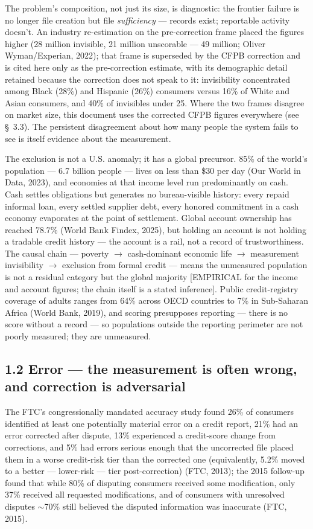 \documentclass[11pt,twocolumn]{article}
\begin{document}
The problem's composition, not just its size, is diagnostic: the frontier failure is no longer file creation but file \emph{sufficiency} --- records exist; reportable activity doesn't. An industry re-estimation on the pre-correction frame placed the figures higher (28 million invisible, 21 million unscorable --- 49 million; Oliver Wyman/Experian, 2022); that frame is superseded by the CFPB correction and is cited here only as the pre-correction estimate, with its demographic detail retained because the correction does not speak to it: invisibility concentrated among Black (28\%) and Hispanic (26\%) consumers versus 16\% of White and Asian consumers, and 40\% of invisibles under 25. Where the two frames disagree on market size, this document uses the corrected CFPB figures everywhere (see \S~3.3). The persistent disagreement about how many people the system fails to see is itself evidence about the measurement.

The exclusion is not a U.S. anomaly; it has a global precursor. 85\% of the world's population --- 6.7 billion people --- lives on less than \$30 per day (Our World in Data, 2023), and economies at that income level run predominantly on cash. Cash settles obligations but generates no bureau-visible history: every repaid informal loan, every settled supplier debt, every honored commitment in a cash economy evaporates at the point of settlement. Global account ownership has reached 78.7\% (World Bank Findex, 2025), but holding an account is not holding a tradable credit history --- the account is a rail, not a record of trustworthiness. The causal chain --- poverty $\rightarrow$ cash-dominant economic life $\rightarrow$ measurement invisibility $\rightarrow$ exclusion from formal credit --- means the unmeasured population is not a residual category but the global majority [EMPIRICAL for the income and account figures; the chain itself is a stated inference]. Public credit-registry coverage of adults ranges from 64\% across OECD countries to 7\% in Sub-Saharan Africa (World Bank, 2019), and scoring presupposes reporting --- there is no score without a record --- so populations outside the reporting perimeter are not poorly measured; they are unmeasured.

\subsection*{1.2 Error --- the measurement is often wrong, and correction is adversarial}

The FTC's congressionally mandated accuracy study found 26\% of consumers identified at least one potentially material error on a credit report, 21\% had an error corrected after dispute, 13\% experienced a credit-score change from corrections, and 5\% had errors serious enough that the uncorrected file placed them in a worse credit-risk tier than the corrected one (equivalently, 5.2\% moved to a better --- lower-risk --- tier post-correction) (FTC, 2013); the 2015 follow-up found that while 80\% of disputing consumers received some modification, only 37\% received all requested modifications, and of consumers with unresolved disputes $\sim$70\% still believed the disputed information was inaccurate (FTC, 2015).
\end{document}
